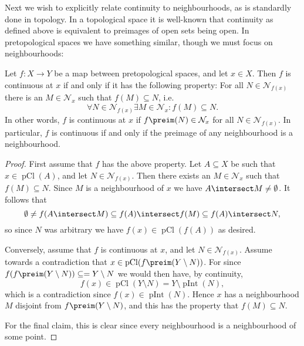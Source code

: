 \documentclass[article, a4paper, 11pt, oneside]{memoir}
\numberwithin{equation}{chapter}
\newcommand{\calN}{\mathcal{N}}
\newcommand{\nhoods}[1]{\calN_{#1}}
\newcommand{\pInt}[1]{\operatorname{pInt}(#1)}
\newcommand{\pCl}[1]{\operatorname{pCl}(#1)}
\begin{document}
Next we wish to explicitly relate continuity to neighbourhoods, as is standardly done in topology. In a topological space it is well-known that continuity as defined above is equivalent to preimages of open sets being open. In pretopological spaces we have something similar, though we must focus on neighbourhoods:

\begin{proposition}
    Let $f \colon X \to Y$ be a map between pretopological spaces, and let $x \in X$. Then $f$ is continuous at $x$ if and only if it has the following property: For all $N \in \nhoods{f(x)}$ there is an $M \in \nhoods{x}$ such that $f(M) \subseteq N$, i.e.
    \begin{equation*}
        \forall N \in \nhoods{f(x)} \exists M \in \nhoods{x} \colon f(M) \subseteq N.
    \end{equation*}
    In other words, $f$ is continuous at $x$ if $f\preim(N) \in \nhoods{x}$ for all $N \in \nhoods{f(x)}$. In particular, $f$ is continuous if and only if the preimage of any neighbourhood is a neighbourhood.
\end{proposition}

\begin{proof}
    First assume that $f$ has the above property. Let $A \subseteq X$ be such that $x \in \pCl{A}$, and let $N \in \nhoods{f(x)}$. Then there exists an $M \in \nhoods{x}$ such that $f(M) \subseteq N$. Since $M$ is a neighbourhood of $x$ we have $A \intersect M \neq \emptyset$. It follows that
    \begin{equation*}
        \emptyset
            \neq f(A \intersect M)
            \subseteq f(A) \intersect f(M)
            \subseteq f(A) \intersect N,
    \end{equation*}
    so since $N$ was arbitrary we have $f(x) \in \pCl{f(A)}$ as desired.

    Conversely, assume that $f$ is continuous at $x$, and let $N \in \nhoods{f(x)}$. Assume towards a contradiction that $x \in \pCl{f\preim(Y \setminus N)}$. For since $f(f\preim(Y \setminus N)) \subseteq = Y \setminus N$ we would then have, by continuity,
    \begin{equation*}
        f(x)
            \in \pCl{Y \setminus N}
            = Y \setminus \pInt{N},
    \end{equation*}
    which is a contradiction since $f(x) \in \pInt{N}$. Hence $x$ has a neighbourhood $M$ disjoint from $f\preim(Y \setminus N)$, and this has the property that $f(M) \subseteq N$.

    For the final claim, this is clear since every neighbourhood is a neighbourhood of some point.
\end{proof}
\end{document}
